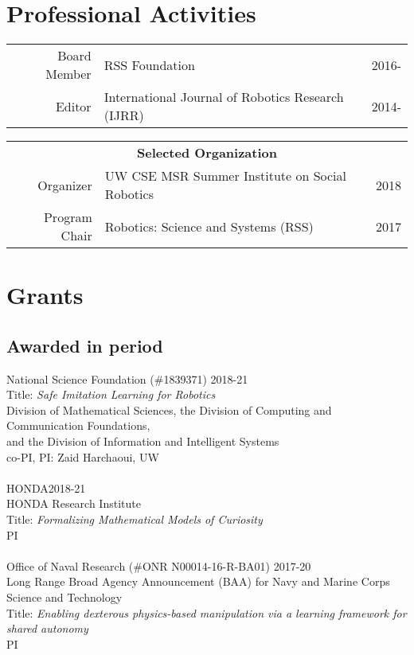 \documentclass[10pt]{article}
\begin{document}
\section{Professional Activities}
\begin{tabularx}{\linewidth}{rXr}
Board Member & RSS Foundation & 2016-\\
Editor & International Journal of Robotics Research (IJRR) & 2014-\\
\end{tabularx}
\begin{tabularx}{\linewidth}{rXr}
\multicolumn{3}{c}{\textbf{Selected Organization}}\\
Organizer & UW CSE MSR Summer Institute on Social Robotics & 2018\\
Program Chair & Robotics: Science and Systems (RSS) & 2017\\
\end{tabularx}


\section{Grants}

\subsection{Awarded in period}
\noindent
National Science Foundation (\#1839371) \hfill 2018-21\\
Title: \textit{Safe Imitation Learning for Robotics}\\
Division of Mathematical Sciences, the Division of Computing and Communication Foundations,\\and the Division of Information and Intelligent Systems\\
co-PI, PI: Zaid Harchaoui, UW\\
\\
HONDA\hfill 2018-21\\
HONDA Research Institute\\
Title: \textit{Formalizing Mathematical Models of Curiosity}\\
PI\\
\\
Office of Naval Research (\#ONR N00014-16-R-BA01) \hfill 2017-20\\
Long Range Broad Agency Announcement (BAA) for Navy and Marine Corps Science and Technology\\
Title: \textit{Enabling dexterous physics-based manipulation via a learning framework for shared autonomy}\\
PI\\
\end{document}
